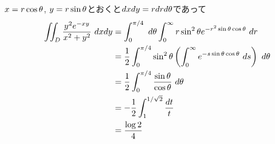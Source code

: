 
\begin{sol}
  $x=r \cos {\theta}$, $y = r\sin {\theta}$とおくと$dx dy = r dr d{\theta}$であって
  \begin{align*}
    \iint_D \frac{y^2 e^{-xy} }{ x^2 + y^2 } \ dx dy &= \int_0^{\pi/4} \ d{\theta} \int_0^{\infty} r \sin^2 {\theta} e^{- r^2 \sin {\theta} \cos {\theta}} \ dr \\
    &= \frac{1}{2} \int_0^{\pi/4} \sin^2 {\theta} \left( \int_0^{\infty}   e^{- s \sin {\theta} \cos {\theta}} \ ds \right) \ d{\theta} \\
    &= \frac{1}{2} \int_0^{\pi/4} \frac{ \sin {\theta} }{\cos {\theta} } \ d{\theta} \\
    &= - \frac{1}{2} \int_1^{1/ \sqrt{2} } \frac{dt}{t} \\
    &= \frac{\log 2}{4}
  \end{align*}
\end{sol}

\newpage

\begin{sol}
  
\end{sol}
